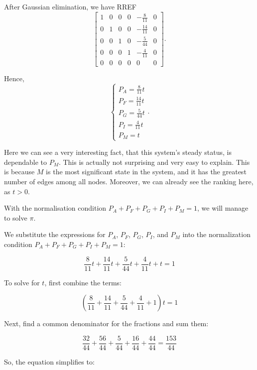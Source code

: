 \documentclass[12pt,a4paper]{article}
\begin{document}
\begin{solution}
    After Gaussian elimination, we have RREF
    $$
    \left[\begin{array}{ccccc|c}
    1 & 0 & 0 & 0 & -\frac{8}{11} & 0 \\
    0 & 1 & 0 & 0 & -\frac{14}{11} & 0 \\
    0 & 0 & 1 & 0 & -\frac{5}{44} & 0 \\
    0 & 0 & 0 & 1 & -\frac{4}{11} & 0 \\
    0 & 0 & 0 & 0 & 0 & 0
    \end{array}\right].
    $$

    Hence,
    \begin{equation}
    \begin{cases}
    P_A=\frac{8}{11} t \\
    P_F=\frac{14}{11} t \\
    P_G=\frac{5}{44} t \\
    P_I=\frac{4}{11} t \\
    P_M=t
    \end{cases}.
    \end{equation}

    \begin{remark}
    Here we can see a very interesting fact, that this system's steady status, is dependable to $P_M$. This is actually not surprising and very easy to explain.
    This is because $M$ is the most significant state in the system, and it has the greatest number of edges among all nodes. Moreover, we can already see the ranking here, as $t>0$.
    \end{remark}
    With the normalisation condition \(P_A + P_F + P_G + P_I + P_M = 1\), we will manage to solve $\pi$.

    We substitute the expressions for \( P_A \), \( P_F \), \( P_G \), \( P_I \), and \( P_M \) into the normalization condition \( P_A + P_F + P_G + P_I + P_M = 1 \):

\[
\frac{8}{11}t + \frac{14}{11}t + \frac{5}{44}t + \frac{4}{11}t + t = 1
\]

To solve for \( t \), first combine the terms:

\[
\left(\frac{8}{11} + \frac{14}{11} + \frac{5}{44} + \frac{4}{11} + 1\right)t = 1
\]

Next, find a common denominator for the fractions and sum them:

\[
\frac{32}{44} + \frac{56}{44} + \frac{5}{44} + \frac{16}{44} + \frac{44}{44} = \frac{153}{44}
\]

So, the equation simplifies to:


\end{solution}
\end{document}
